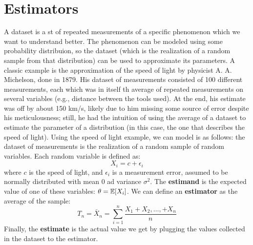 \section{Estimators}

A dataset is a st of repeated measurements of a specific phenomenon which we want to understand better. The phenomenon can be modeled using some probability distribuion, so the dataset (which is the realization of a random sample from that distribution) can be used to approximate its parameters.
A classic example is the approximation of the speed of light by physicist A. A. Michelson, done in 1879. His dataset of measurements consisted of 100 different measurements, each which was in itself th average of repeated measurements on several variables (e.g., distance between the tools used). At the end, his estimate was off by about 150 km/s, likely due to him missing some source of error despite his meticulousness; still, he had the intuition of using the average of a dataset to estimate the parameter of a distribution (in this case, the one that describes the speed of light).
Using the speed of light example, we can model is as follows: the dataset of measurements is the realization of a random sample of random variables. Each random variable is defined as:
\begin{equation*}
    X_i = c + \epsilon_i
\end{equation*}   
where $c$ is the speed of light, and $\epsilon_i$ is a measurement error, assumed to be normally distributed with mean 0 ad variance $\sigma^2$. The \textbf{estimand} is the expected value of one of these variables: $\theta = \mathbb{E}[X_i]$. We can define an \textbf{estimator} as the average of the sample:
\begin{equation*}
    T_n = \bar{X}_n = \sum_{i=1}^n \frac{X_1 + X_2, \ldots, + X_n}{n}
\end{equation*}   
Finally, the \textbf{estimate} is the actual value we get by plugging the values collected in the dataset to the estimator.

